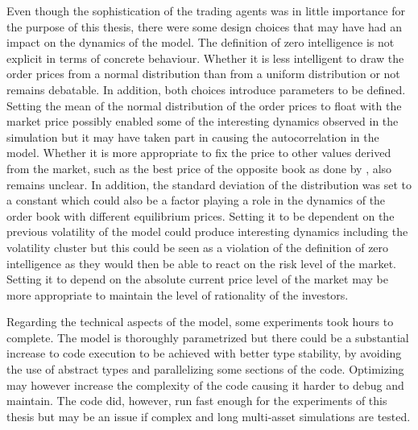 Even though the sophistication of the trading agents was in little
importance for the purpose of this thesis, there were some design
choices that may have had an impact on the dynamics of the model.
The definition of zero intelligence is not explicit in terms of
concrete behaviour. Whether it is less intelligent to draw the
order prices from a normal distribution than from a uniform
distribution or not remains debatable. In addition, both choices
introduce parameters to be defined. Setting the mean of the
normal distribution of the order prices to float with the 
market price possibly enabled some of the interesting dynamics
observed in the simulation but it may have taken part in causing the
autocorrelation in the model. Whether it is more appropriate
to fix the price to other values derived from the market,
such as the best price of the opposite book as done by
\citet{Genoa01}, also remains unclear. In addition, the 
standard deviation of the distribution was set to a constant
which could also be a factor playing a role in the dynamics 
of the order book with different equilibrium prices. Setting
it to be dependent on the previous volatility of the model
could produce interesting dynamics including the volatility
cluster but this could be seen as a violation of the definition
of zero intelligence as they would then be able to react on the risk level
of the market. Setting it to depend on the absolute 
current price level of the market may be more appropriate to 
maintain the level of rationality of the investors. 

Regarding the technical aspects of the model, some experiments 
took hours to complete. The model is thoroughly parametrized but 
there could be a substantial increase to code execution to be 
achieved with better type stability, by avoiding the use of 
abstract types and parallelizing some sections of the code. 
Optimizing may however increase the complexity of the code 
causing it harder to debug and maintain. The code did, however, 
run fast enough for the experiments of this thesis but may be 
an issue if complex and long multi-asset simulations are tested. 

